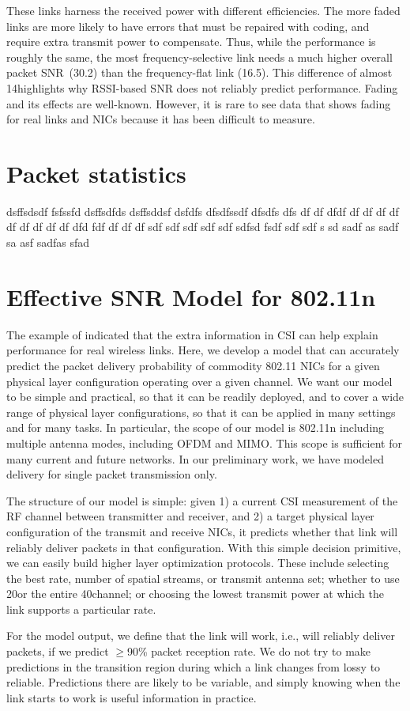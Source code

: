 These links harness the received power with different efficiencies.
The more faded links are more likely to have errors that must be repaired with coding, and require extra transmit power to compensate. Thus, while the performance is roughly the same, the most frequency-selective link needs a much higher overall packet SNR~(30.2\dB) than the frequency-flat link (16.5\dB). This difference of almost 14\dB highlights why RSSI-based SNR does not reliably predict performance. Fading and its effects are well-known. However, it is rare to see data that shows fading for real links and NICs because it has been difficult to measure.

\section{Packet statistics}
dsffsdsdf
fsfssfd
dsffsdfds
dsffsddsf
dsfdfs
dfsdfssdf
dfsdfs
dfs
df
df
dfdf
df
df
df
df
df
df
df
df
df
dfd
fdf
df
df
df
sdf
sdf
sdf
sdf
sdf
sdfsd
fsdf
sdf
sdf
s
sd
sadf
as
sadf
sa
asf
sadfas
sfad


\section{Effective SNR Model for 802.11n}
The example of  indicated that the extra information in CSI can help explain performance for real wireless links. Here, we develop a model that can accurately predict the packet delivery probability of commodity 802.11 NICs for a given physical layer configuration operating over a given channel. We want our model to be simple and practical, so that it can be readily deployed, and to cover a wide range of physical layer configurations, so that it can be applied in many settings and for many tasks. In particular, the scope of our model is 802.11n including multiple antenna modes, including OFDM and MIMO\@. This scope is sufficient for many current and future networks. In our preliminary work, we have modeled delivery for single packet transmission only.

The structure of our model is simple: given 1) a current CSI measurement of the RF channel between transmitter and receiver, and 2) a target physical layer configuration of the transmit and receive NICs, it predicts whether that link will reliably deliver packets in that configuration.
With this simple decision primitive, we can easily build higher layer optimization protocols. These include selecting the best rate, number of spatial streams, or transmit antenna set; whether to use 20\MHz or the entire 40\MHz channel; or choosing the lowest transmit power at which the link supports a particular rate.

For the model output, we define that the link will work, i.e., will reliably deliver packets, if we predict $\geq$90\% packet reception rate. We do not try to make predictions in the transition region during which a link changes from lossy to reliable. Predictions there are likely to be variable, and simply knowing when the link starts to work is useful information in practice.



\ifx\mainfile\undefined

\fi
